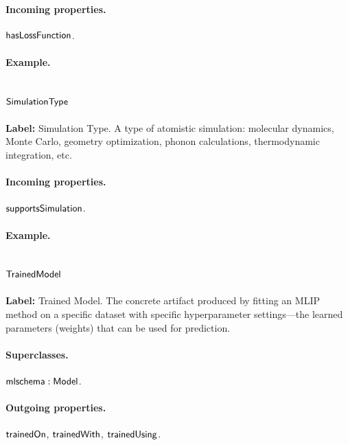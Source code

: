 \paragraph{Incoming properties.} $\mathsf{hasLossFunction}$.

\paragraph{Example.}

\subsection{$\mathsf{SimulationType}$}
\label{sec:term-SimulationType}

\textbf{Label:} Simulation Type.
A type of atomistic simulation: molecular dynamics, Monte Carlo, geometry optimization, phonon calculations, thermodynamic integration, etc.

\paragraph{Incoming properties.} $\mathsf{supportsSimulation}$.

\paragraph{Example.}

\subsection{$\mathsf{TrainedModel}$}
\label{sec:term-TrainedModel}

\textbf{Label:} Trained Model.
The concrete artifact produced by fitting an MLIP method on a specific dataset with specific hyperparameter settings---the learned parameters (weights) that can be used for prediction.

\paragraph{Superclasses.} $\mathsf{mlschema:Model}$.

\paragraph{Outgoing properties.} $\mathsf{trainedOn}$, $\mathsf{trainedWith}$, $\mathsf{trainedUsing}$.

